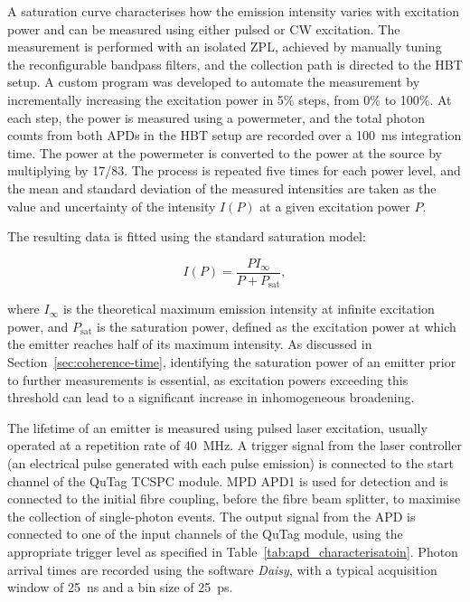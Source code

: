 A saturation curve characterises how the emission intensity varies with excitation power and can be measured using either pulsed or CW excitation. The measurement is performed with an isolated ZPL, achieved by manually tuning the reconfigurable bandpass filters, and the collection path is directed to the HBT setup. A custom program was developed to automate the measurement by incrementally increasing the excitation power in 5\% steps, from 0\% to 100\%. At each step, the power is measured using a powermeter, and the total photon counts from both APDs in the HBT setup are recorded over a 100~ms integration time. The power at the powermeter is converted to the power at the source by multiplying by 17/83. The process is repeated five times for each power level, and the mean and standard deviation of the measured intensities are taken as the value and uncertainty of the intensity $I(P)$ at a given excitation power $P$.

The resulting data is fitted using the standard saturation model:

\begin{equation}
    I(P) = \frac{P I_{\infty}}{P + P_{\text{sat}}},
    \label{eqn:p-sat}
\end{equation}

where $I_{\infty}$ is the theoretical maximum emission intensity at infinite excitation power, and $P_{\text{sat}}$ is the saturation power, defined as the excitation power at which the emitter reaches half of its maximum intensity. As discussed in Section~\ref{sec:coherence-time}, identifying the saturation power of an emitter prior to further measurements is essential, as excitation powers exceeding this threshold can lead to a significant increase in inhomogeneous broadening.

The lifetime of an emitter is measured using pulsed laser excitation, usually operated at a repetition rate of 40~MHz. A trigger signal from the laser controller (an electrical pulse generated with each pulse emission) is connected to the start channel of the QuTag TCSPC module. MPD APD1 is used for detection and is connected to the initial fibre coupling, before the fibre beam splitter, to maximise the collection of single-photon events. The output signal from the APD is connected to one of the input channels of the QuTag module, using the appropriate trigger level as specified in Table~\ref{tab:apd_characterisatoin}. Photon arrival times are recorded using the software \textit{Daisy}, with a typical acquisition window of 25~ns and a bin size of 25~ps.

